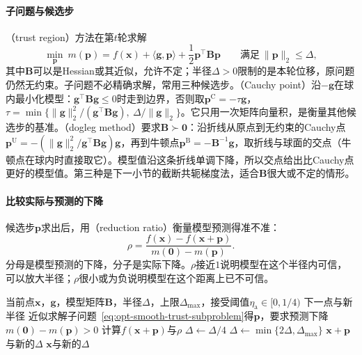 \paragraph{子问题与候选步}
（trust region）方法在第$t$轮求解
\begin{equation}
\label{eq:opt-smooth-trust-subproblem}
  \min_{\bm p}\ m(\bm p)=f(\bm x)+\langle\bm g,\bm p\rangle+\frac12\bm p^\top\bm B\bm p\qquad\text{满足}\ \lVert\bm p\rVert_2\leq\Delta ,
\end{equation}
其中$\bm B$可以是Hessian或其近似，允许不定；半径$\Delta>0$限制的是本轮位移，原问题仍然无约束。子问题不必精确求解，常用三种候选步。（Cauchy point）沿$-\bm g$在球内最小化模型：$\bm g^\top\bm B\bm g\leq0$时走到边界，否则取$\bm p^{\mathrm C}=-\tau\bm g$，$\tau=\min\{\lVert\bm g\rVert_2^2/(\bm g^\top\bm B\bm g),\ \Delta/\lVert\bm g\rVert_2\}$。它只用一次矩阵向量积，是衡量其他候选步的基准。（dogleg method）要求$\bm B\succ\bm0$：沿折线从原点到无约束的Cauchy点$\bm p^{\mathrm U}=-(\lVert\bm g\rVert_2^2/\bm g^\top\bm B\bm g)\bm g$，再到牛顿点$\bm p^{\mathrm B}=-\bm B^{-1}\bm g$，取折线与球面的交点（牛顿点在球内时直接取它）。模型值沿这条折线单调下降，所以交点给出比Cauchy点更好的模型值。第三种是下一小节的截断共轭梯度法，适合$\bm B$很大或不定的情形。

\paragraph{比较实际与预测的下降}
候选步$\bm p$求出后，用（reduction ratio）衡量模型预测得准不准：
\begin{equation}
\label{eq:opt-smooth-trust-ratio}
  \rho=\frac{f(\bm x)-f(\bm x+\bm p)}{m(\bm0)-m(\bm p)} .
\end{equation}
分母是模型预测的下降，分子是实际下降。$\rho$接近$1$说明模型在这个半径内可信，可以放大半径；$\rho$很小或为负说明模型在这个距离上已不可信。

\begin{algorithm}[信赖域方法的一轮]
\label{alg:opt-smooth-trust-region}
\begin{algorithmic}[1]
\Require 当前点$\bm x$，$\bm g$，模型矩阵$\bm B$，半径$\Delta$，上限$\Delta_{\max}$，接受阈值$\eta_{\mathrm a}\in[0,1/4)$
\Ensure 下一点与新半径
\State 近似求解子问题~\eqref{eq:opt-smooth-trust-subproblem}得$\bm p$，要求预测下降$m(\bm0)-m(\bm p)>0$
\State 计算$f(\bm x+\bm p)$与$\rho$
 \State $\Delta\gets\Delta/4$
 \State $\Delta\gets\min\{2\Delta,\Delta_{\max}\}$
\EndIf
{} \State \Return $\bm x+\bm p$与新的$\Delta$ 
\Else \State \Return $\bm x$与新的$\Delta$ 
\EndIf
\end{algorithmic}
\end{algorithm}

